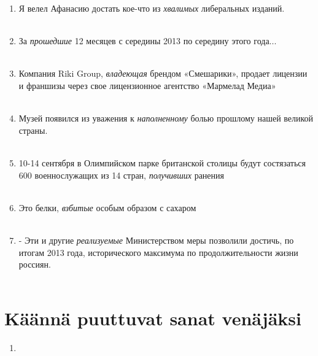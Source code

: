 \documentclass[paper=a4, fontsize=11pt]{scrartcl}
\begin{document}
\begin{enumerate}
    \item Я велел Афанасию достать кое-что из \emph{хвалимых} либеральных изданий. \\
    \underline{\hspace{12cm}} \\
    \item За \emph{прошедшие} 12 месяцев с середины 2013 по середину этого года... \\
    \underline{\hspace{12cm}} \\
    \item Компания Riki Group, \emph{владеющая} брендом «Смешарики», продает лицензии и франшизы через свое лицензионное агентство «Мармелад Медиа» \\
    \underline{\hspace{12cm}} \\
    \item Музей появился из уважения к \emph{наполненному} болью прошлому нашей великой страны. \\
    \underline{\hspace{12cm}} \\
    \item 10-14 сентября в Олимпийском парке британской столицы будут состязаться 600 военнослужащих из 14 стран, \emph{получивших} ранения\\
    \underline{\hspace{12cm}} \\
    \item Это белки, \emph{взбитые} особым образом с сахаром \\
    \underline{\hspace{12cm}} \\
    \item - Эти и другие \emph{реализуемые} Министерством меры позволили достичь, по итогам 2013 года, исторического максимума по продолжительности жизни россиян. \\
    \underline{\hspace{12cm}} \\
\end{enumerate}


\section{Käännä puuttuvat sanat venäjäksi}

\begin{enumerate}
    \item 
\end{enumerate}
\end{document}
